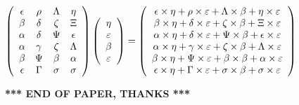 \documentclass[12pt]{article}
\begin{document}
$  %
 \left( \begin{array}
 {
 c
 c
 c
 c
 }
 \epsilon & 
 \rho & 
 \Lambda & 
 \eta \\ 
 \beta & 
 \delta & 
                    \zeta & 
                    \Xi \\ 
 \alpha & 
 \delta & 
 \Psi & 
 \epsilon \\ 
 \alpha & 
 \gamma & 
                    \zeta & 
 \Lambda \\ 
 \beta & 
 \Psi & 
 \beta & 
 \alpha \\ 
 \epsilon & 
 \Gamma & 
 \sigma & 
 \sigma
 \end{array} \right)
 \left( \begin{array}
 {
 c
 }
 \eta \\ 
 \varepsilon \\ 
 \beta \\ 
 \varepsilon
 \end{array} \right)
=
 \left( \begin{array}
 {
 c
 }
  \epsilon \times  \eta +  \rho \times  \varepsilon +  \Lambda \times  \beta +  \eta \times  \varepsilon \\ 
  \beta \times  \eta +  \delta \times  \varepsilon +                     \zeta \times  \beta +                     \Xi \times  \varepsilon \\ 
  \alpha \times  \eta +  \delta \times  \varepsilon +  \Psi \times  \beta +  \epsilon \times  \varepsilon \\ 
  \alpha \times  \eta +  \gamma \times  \varepsilon +                     \zeta \times  \beta +  \Lambda \times  \varepsilon \\ 
  \beta \times  \eta +  \Psi \times  \varepsilon +  \beta \times  \beta +  \alpha \times  \varepsilon \\ 
  \epsilon \times  \eta +  \Gamma \times  \varepsilon +  \sigma \times  \beta +  \sigma \times  \varepsilon
 \end{array} \right)
$
 
 
 
 
 
\noindent{}

 
 
   
   
 \vspace{0.2in}
 
   
   
   
   
\vspace{1.0in} 
{\textbf{\large{ *** END OF PAPER, THANKS *** }}} 
   
\end{document}

